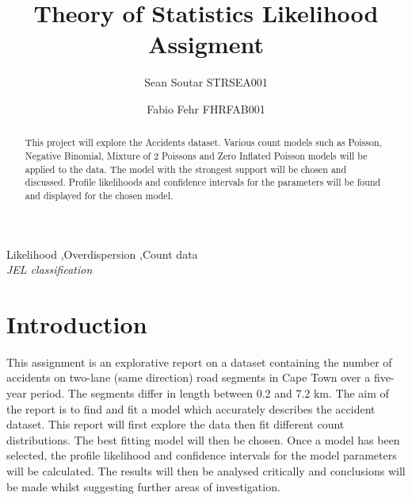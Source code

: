 \documentclass[11pt,preprint, authoryear]{elsarticle}
\numberwithin{equation}{section}
\numberwithin{figure}{section}
\numberwithin{table}{section}
\begin{document}
\begin{frontmatter}  %

\title{Theory of Statistics Likelihood Assigment}

\author[Add1]{Sean Soutar STRSEA001}

\author[Add2]{Fabio Fehr FHRFAB001}




\address[Add1]{UCT Statistics Honours, Cape Town, South Africa}
\address[Add2]{UCT Statistics Honours, Cape Town, South Africa}


\begin{abstract}
\small{
This project will explore the Accidents dataset. Various count models
such as Poisson, Negative Binomial, Mixture of 2 Poissons and Zero
Inflated Poisson models will be applied to the data. The model with the
strongest support will be chosen and discussed. Profile likelihoods and
confidence intervals for the parameters will be found and displayed for
the chosen model.
}
\end{abstract}

\vspace{1cm}

\begin{keyword}
\footnotesize{
Likelihood \sep Overdispersion \sep Count data \\ \vspace{0.3cm}
\textit{JEL classification} 
}
\end{keyword}
\vspace{0.5cm}
\end{frontmatter}



\pagestyle{fancy}
\chead{}
\rhead{}
\lfoot{}
\lhead{}
\cfoot{}


\headsep 35pt %




\section{Introduction}\label{introduction}

This assignment is an explorative report on a dataset containing the
number of accidents on two-lane (same direction) road segments in Cape
Town over a five-year period. The segments differ in length between 0.2
and 7.2 km. The aim of the report is to find and fit a model which
accurately describes the accident dataset. This report will first
explore the data then fit different count distributions. The best
fitting model will then be chosen. Once a model has been selected, the
profile likelihood and confidence intervals for the model parameters
will be calculated. The results will then be analysed critically and
conclusions will be made whilst suggesting further areas of
investigation.
\end{document}
